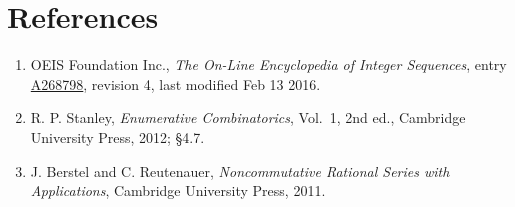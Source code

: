 \documentclass[11pt]{article}
\theoremstyle{definition}
\begin{document}
\section{References}

\begin{enumerate}

\item OEIS Foundation Inc., \emph{The On-Line Encyclopedia of Integer Sequences}, entry \href{https://oeis.org/A268798}{A268798}, revision 4, last modified Feb 13 2016.

\item R. P. Stanley, \emph{Enumerative Combinatorics}, Vol.~1, 2nd ed., Cambridge University Press, 2012; \S4.7.

\item J. Berstel and C. Reutenauer, \emph{Noncommutative Rational Series with Applications}, Cambridge University Press, 2011.

\end{enumerate}
\end{document}
